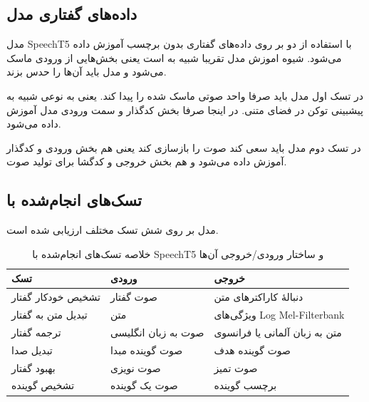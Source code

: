 \subsection{ داده‌های گفتاری مدل}

مدل SpeechT5 با استفاده از دو 
بر روی داده‌های گفتاری بدون برچسب آموزش داده می‌شود. شیوه اموزش مدل تقریبا شبیه به  است یعنی بخش‌هایی از ورودی ماسک می‌شود و مدل باید آن‌ها را حدس بزند. 

در تسک اول مدل باید صرفا واحد صوتی ماسک شده را پیدا کند. یعنی به نوعی شبیه به پیشبینی توکن در فضای متنی. در اینجا صرفا بخش کدگذار و سمت ورودی مدل آموزش داده می‌شود. 

در تسک دوم مدل باید سعی کند صوت را بازسازی کند یعنی هم بخش ورودی و کدگذار آموزش داده می‌شود و هم بخش خروجی و کدگشا برای تولید صوت.

\subsection{  تسک‌های انجام‌شده با }

مدل 
 بر روی شش تسک مختلف  ارزیابی شده است.

\begin{table}[h!]
	\centering
	\begin{tabular}{|p{2.5cm}|p{3.5cm}|p{3.5cm}|}
		\hline
		\textbf{تسک} & \textbf{ورودی} & \textbf{خروجی} \\
		\hline
		تشخیص خودکار گفتار &صوت گفتار & دنبالهٔ کاراکترهای متن \\
		\hline
		تبدیل متن به گفتار & متن& ویژگی‌های Log Mel-Filterbank \\
		\hline
		ترجمه گفتار & صوت به زبان انگلیسی &متن به زبان آلمانی یا فرانسوی \\
		\hline
		تبدیل صدا  & صوت گوینده مبدا & صوت گوینده هدف \\
		\hline
		بهبود گفتار & صوت نویزی & صوت تمیز \\
		\hline
		تشخیص گوینده  & صوت یک گوینده & برچسب گوینده \\
		\hline
	\end{tabular}
	\caption{خلاصه تسک‌های انجام‌شده با SpeechT5 و ساختار ورودی/خروجی آن‌ها}
\end{table}



